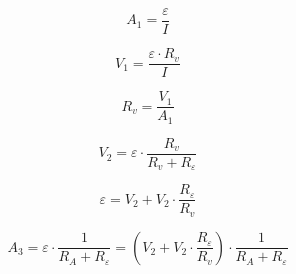 \documentclass[11pt]{article}
\begin{document}
    \begin{equation}
        A_1 = \frac{\varepsilon}{I}\label{eq:equation2}
    \end{equation}

    \begin{equation}
        V_1 = \frac{\varepsilon \cdot R_v}{I}\label{eq:equation}
    \end{equation}

    \begin{equation*}
        R_v = \frac{V_1}{A_1}
    \end{equation*}

    \begin{equation}
        V_2 = \varepsilon \cdot \frac{R_v}{R_v + R_\varepsilon}\label{eq:equation3}
    \end{equation}

    \begin{equation*}
        \varepsilon = V_2 + V_2 \cdot \frac{R_\varepsilon}{R_v}
    \end{equation*}

    \begin{equation}
        A_3 = \varepsilon \cdot \frac{1}{R_A + R_\varepsilon} = (V_2 + V_2 \cdot \frac{R_\varepsilon}{R_v}) \cdot \frac{1}{R_A + R_\varepsilon} \label{eq:equation4}
    \end{equation}
\end{document}
